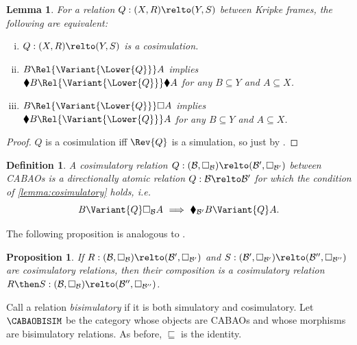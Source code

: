 \documentclass[10pt,a4paper]{article}
\newtheorem{lemma}[theorem]{Lemma}
\newtheorem{proposition}[theorem]{Proposition}
\newtheorem{definition}[theorem]{Definition}
\begin{document}
\begin{lemma}\label{lemma:cosim-black}\label{lemma:cosimulatory}
  For a relation \(Q : (X, R) \relto (Y, S)\) between Kripke frames,
  the following are equivalent:
  \begin{enumerate}[(i)]
  \item \(Q : (X, R) \relto (Y, S)\) is a cosimulation.
  \item \(B \Rel{\Variant{\Lower{Q}}} A\) implies
    \(\blacklozenge B \Rel{\Variant{\Lower{Q}}} \blacklozenge A\) for
    any \(B \subseteq Y\) and \(A \subseteq X\).
  \item \(B \Rel{\Variant{\Lower{Q}}} \Box A\) implies
    \(\blacklozenge B \Rel{\Variant{\Lower{Q}}} A\) for any
    \(B \subseteq Y\) and \(A \subseteq X\).
  \end{enumerate}
\end{lemma}
\begin{proof}
  \(Q\) is a cosimulation iff \(\Rev{Q}\) is a simulation, so just by
  .
\end{proof}

\begin{definition}
  A \emph{cosimulatory relation}
  \(Q : (\mathcal{B}, \Box_\mathcal{B}) \relto (\mathcal{B}',
  \Box_{\mathcal{B}'})\) between CABAOs is a directionally atomic
  relation \(Q : \mathcal{B} \relto \mathcal{B}'\) for which the
  condition of \cref{lemma:cosimulatory} holds, i.e.\
  \[
    B \Variant{Q} \Box_\mathcal{B} A\
    \Longrightarrow\
    \blacklozenge_{\mathcal{B}'} B \Variant{Q} A.
  \]
\end{definition}

The following proposition is analogous to
.

\begin{proposition}
  \label{proposition:cosimulatory-compose}
  If
  \(R : (\mathcal{B}, \Box_\mathcal{B}) \relto (\mathcal{B}',
  \Box_{\mathcal{B}'})\) and
  \(S : (\mathcal{B}', \Box_{\mathcal{B}'}) \relto (\mathcal{B}'',
  \Box_{\mathcal{B}''})\) are cosimulatory relations, then their composition
  is a cosimulatory relation
  \(R \then S : (\mathcal{B}, \Box_\mathcal{B}) \relto (\mathcal{B}'',
  \Box_{\mathcal{B}''})\).
\end{proposition}

Call a relation \emph{bisimulatory} if it is both simulatory and
cosimulatory. Let \(\CABAOBISIM\) be the category whose objects are
CABAOs and whose morphisms are bisimulatory relations. As before,
\(\sqsubseteq\) is the identity.
\end{document}
